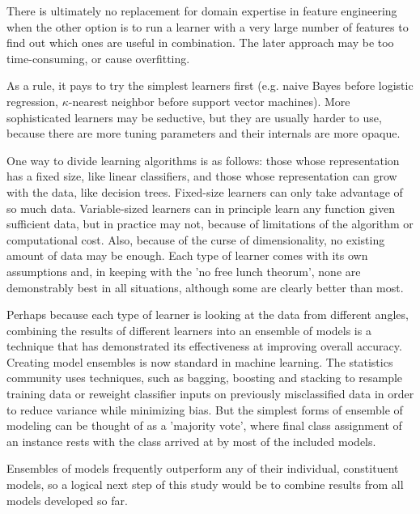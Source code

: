 There is ultimately no replacement for domain expertise in feature engineering when the other option is to run a learner with a very large number of features to find out which ones are useful in combination. The later approach may be too time-consuming, or cause overfitting. \cite{Eklund2014}

As a rule, it pays to try the simplest learners first (e.g. naive Bayes before logistic regression, $\kappa$-nearest neighbor before support vector machines). More sophisticated learners may be seductive, but they are usually harder to use, because there are more tuning parameters and their internals are more opaque. \cite{Domingos2012}

One way to divide learning algorithms is as follows: those whose representation has a fixed size, like linear classifiers, and those whose representation can grow with the data, like decision trees. Fixed-size learners can only take advantage of so much data. Variable-sized learners can in principle learn any function given sufficient data, but in practice may not, because of limitations of the algorithm or computational cost. Also, because of the curse of dimensionality, no existing amount of data may be enough. \cite{Domingos2012} Each type of learner comes with its own assumptions and, in keeping with the 'no free lunch theorum', none are demonstrably best in all situations, although some are clearly better than most. \cite{Hand2006,Delgado2014}

Perhaps because each type of learner is looking at the data from different angles, combining the results of different learners into an ensemble of models is a technique that has demonstrated its effectiveness at improving overall accuracy. Creating model ensembles is now standard in machine learning. The statistics community uses techniques, such as bagging, boosting and stacking to resample training data or reweight classifier inputs on previously misclassified data in order to reduce variance while minimizing bias. But the simplest forms of ensemble of modeling can be thought of as a 'majority vote', where final class assignment of an instance rests with the class arrived at by most of the included models.


Ensembles of models frequently outperform any of their individual, constituent models, so a logical next step of this study would be to combine results from all models developed so far.

